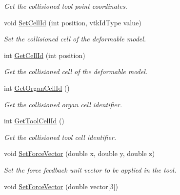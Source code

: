 \begin{DoxyCompactItemize}
\begin{DoxyCompactList}\small\item\em Get the collisioned tool point coordinates. \item\end{DoxyCompactList}\item 
void \hyperlink{classvtkContact_a3ebc1a4dedf313b3f02f17a412cee88c}{SetCellId} (int position, vtkIdType value)
\begin{DoxyCompactList}\small\item\em Set the collisioned cell of the deformable model. \item\end{DoxyCompactList}\item 
int \hyperlink{classvtkContact_a825566e780e4fca5dc766b3c7c259366}{GetCellId} (int position)
\begin{DoxyCompactList}\small\item\em Get the collisioned cell of the deformable model. \item\end{DoxyCompactList}\item 
\hypertarget{classvtkContact_a3bd009504801ff326fcda89ee2611ef0}{
int \hyperlink{classvtkContact_a3bd009504801ff326fcda89ee2611ef0}{GetOrganCellId} ()}
\label{classvtkContact_a3bd009504801ff326fcda89ee2611ef0}

\begin{DoxyCompactList}\small\item\em Get the collisioned organ cell identifier. \item\end{DoxyCompactList}\item 
\hypertarget{classvtkContact_af4fbfa2af472f77618c55a5bc9f7df0a}{
int \hyperlink{classvtkContact_af4fbfa2af472f77618c55a5bc9f7df0a}{GetToolCellId} ()}
\label{classvtkContact_af4fbfa2af472f77618c55a5bc9f7df0a}

\begin{DoxyCompactList}\small\item\em Get the collisioned tool cell identifier. \item\end{DoxyCompactList}\item 
\hypertarget{classvtkContact_a061c000c3694de5c2a55cfa9ed301bc8}{
void \hyperlink{classvtkContact_a061c000c3694de5c2a55cfa9ed301bc8}{SetForceVector} (double x, double y, double z)}
\label{classvtkContact_a061c000c3694de5c2a55cfa9ed301bc8}

\begin{DoxyCompactList}\small\item\em Set the force feedback unit vector to be applied in the tool. \item\end{DoxyCompactList}\item 
\hypertarget{classvtkContact_aa0fa9dd11572fd44b76f8d2f9250336b}{
void \hyperlink{classvtkContact_aa0fa9dd11572fd44b76f8d2f9250336b}{SetForceVector} (double vector\mbox{[}3\mbox{]})}
\label{classvtkContact_aa0fa9dd11572fd44b76f8d2f9250336b}


\end{DoxyCompactItemize}
